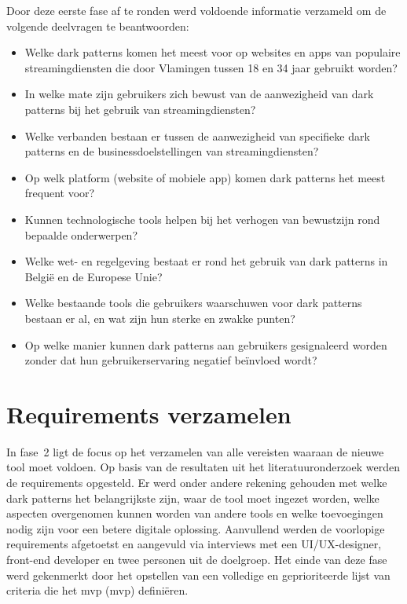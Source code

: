 \vspace{1em}

Door deze eerste fase af te ronden werd voldoende informatie verzameld om de volgende deelvragen te beantwoorden:

\begin{itemize}
    \item Welke dark patterns komen het meest voor op websites en apps van populaire streamingdiensten die door Vlamingen tussen 18 en 34 jaar gebruikt worden?
    \item In welke mate zijn gebruikers zich bewust van de aanwezigheid van dark patterns bij het gebruik van streamingdiensten?
    \item Welke verbanden bestaan er tussen de aanwezigheid van specifieke dark patterns en de businessdoelstellingen van streamingdiensten?
    \item Op welk platform (website of mobiele app) komen dark patterns het meest frequent voor?
    \item Kunnen technologische tools helpen bij het verhogen van bewustzijn rond bepaalde onderwerpen?
    \item Welke wet- en regelgeving bestaat er rond het gebruik van dark patterns in België en de Europese Unie?
    \item Welke bestaande tools die gebruikers waarschuwen voor dark patterns bestaan er al, en wat zijn hun sterke en zwakke punten?
    \item Op welke manier kunnen dark patterns aan gebruikers gesignaleerd worden zonder dat hun gebruikerservaring negatief beïnvloed wordt?
\end{itemize}

\vspace{1em}

\section{Requirements verzamelen}
\label{sec:requirements-verzamelen}

\vspace{1em}

In fase~2 ligt de focus op het verzamelen van alle vereisten waaraan de nieuwe tool moet voldoen. Op basis van de resultaten uit het literatuuronderzoek werden de requirements opgesteld. Er werd onder andere rekening gehouden met welke dark patterns het belangrijkste zijn, waar de tool moet ingezet worden, welke aspecten overgenomen kunnen worden van andere tools en welke toevoegingen nodig zijn voor een betere digitale oplossing. Aanvullend werden de voorlopige requirements afgetoetst en aangevuld via interviews met een UI/UX-designer, front-end developer en twee personen uit de doelgroep. Het einde van deze fase werd gekenmerkt door het opstellen van een volledige en geprioriteerde lijst van criteria die het \acrlong{mvp} (\acrshort{mvp}) definiëren.

